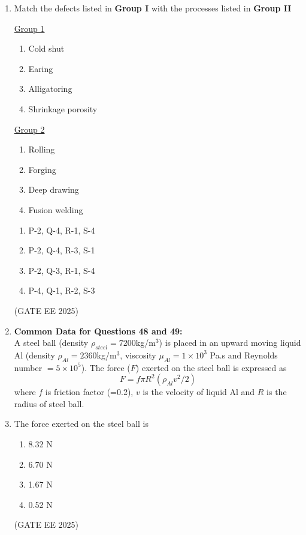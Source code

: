 \documentclass[11pt, letterpaper]{article}
\theoremstyle{remark}
\begin{document}
\begin{enumerate}
\item Match the defects listed in \textbf{Group I} with the processes listed in \textbf{Group II}

\begin{multicols}{2}
\underline{Group 1}
\begin{enumerate}[label=(\Alph*), start=16]
\item Cold shut  
\item Earing
\item Alligatoring  
\item Shrinkage porosity
\end{enumerate}

\underline{Group 2}
\begin{enumerate}[label=(\arabic*), start=1]
\item Rolling 
\item Forging 
\item Deep drawing
\item Fusion welding
\end{enumerate}
\end{multicols}

\begin{multicols}{2}
\begin{enumerate}
\item P-2, Q-4, R-1, S-4
\item P-2, Q-4, R-3, S-1
\item P-2, Q-3, R-1, S-4
\item P-4, Q-1, R-2, S-3
\end{enumerate}
\end{multicols}
\hfill(GATE EE 2025)

\item[] \textbf{Common Data for Questions 48 and 49:} \\
A steel ball (density $\rho_{steel}=7200$kg/m$^3$) is placed in an upward moving liquid Al (density $\rho_{Al}=2360$kg/m$^3$, viscosity $\mu_{Al}=1\times10^3$ Pa.s and Reynolds number $=5\times10^5$). The force ($F$) exerted on the steel ball is expressed as \\
\[
    F = f \pi R^2 \left( \rho_{Al}v^2/2 \right)
\]
where $f$ is friction factor (=0.2), $v$ is the velocity of liquid Al and $R$ is the radius of steel ball.

\item The force exerted on the steel ball is
\begin{multicols}{2}
\begin{enumerate}  
\item 8.32 N
\item 6.70 N
\item 1.67 N
\item 0.52 N
\end{enumerate}
\end{multicols}
\hfill(GATE EE 2025)


\end{enumerate}
\end{document}
